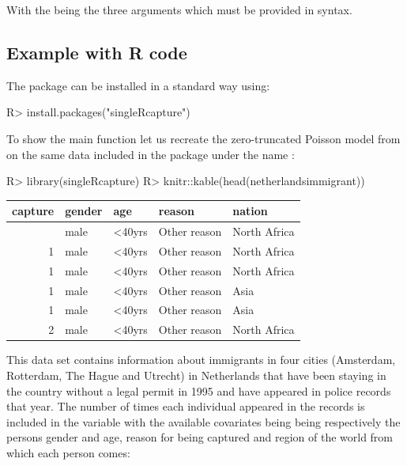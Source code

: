 \documentclass[
]{jss}
\newcommand{\1}{\mathcal{I}} \newcommand{\bZero}{\boldsymbol{0}}
\begin{document}
With the  being the three arguments which
must be provided in  syntax.

\subsection{Example with R code}\label{example-with-r-code}

The package can be installed in a standard way using:

\begin{CodeChunk}
\begin{CodeInput}
R> install.packages("singleRcapture")
\end{CodeInput}
\end{CodeChunk}

To show the main function let us recreate the zero-truncated Poisson
model from \cite{ztpoisson} on the same data included in the package
under the name :

\begin{CodeInput}
R> library(singleRcapture)
R> knitr::kable(head(netherlandsimmigrant))
\end{CodeInput}

\begin{longtable}[]{@{}rllll@{}}
\toprule\noalign{}
capture & gender & age & reason & nation \\
\midrule\noalign{}
\endhead
\bottomrule\noalign{}
\endlastfoot
1 & male & \textless40yrs & Other reason & North Africa \\
1 & male & \textless40yrs & Other reason & North Africa \\
1 & male & \textless40yrs & Other reason & North Africa \\
1 & male & \textless40yrs & Other reason & Asia \\
1 & male & \textless40yrs & Other reason & Asia \\
2 & male & \textless40yrs & Other reason & North Africa \\
\end{longtable}

This data set contains information about immigrants in four cities
(Amsterdam, Rotterdam, The Hague and Utrecht) in Netherlands that have
been staying in the country without a legal permit in 1995 and have
appeared in police records that year. The number of times each
individual appeared in the records is included in the 
variable with the available covariates being
 being respectively the persons gender
and age, reason for being captured and region of the world from which
each person comes:
\end{document}
